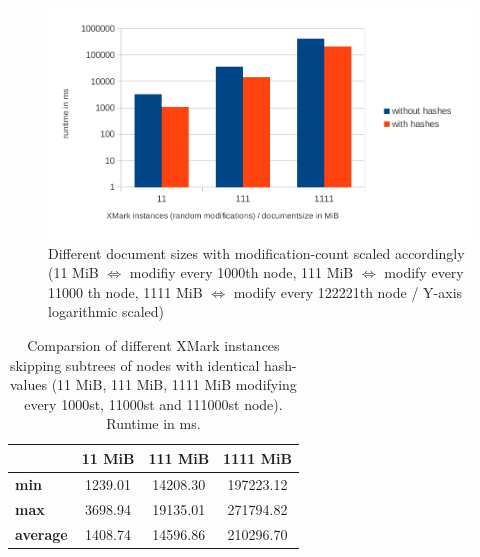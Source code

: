\begin{figure}[tb]
\centering
\includegraphics[width=\textwidth]{figures/diff-docsize-scale-pruned}
\caption{Different document sizes with modification-count scaled accordingly (11 MiB $\Leftrightarrow$ modifiy every 1000th node, 111 MiB $\Leftrightarrow$ modify every 11000 th node, 1111 MiB $\Leftrightarrow$ modify every 122221th node / Y-axis logarithmic scaled)} 
\label{fig:docScaling}
\end{figure}

\begin{table}[tb]
\centering 
\begin{tabular}[r]{|l|c|c|c|} 
\hline
& \textbf{11 MiB} & \textbf{111 MiB} & \textbf{1111 MiB}\\
\hline
\hline
\textbf{min} & 1239.01 & 14208.30 & 197223.12\\
\hline
\textbf{max} & 3698.94 & 19135.01 & 271794.82\\
\hline
\textbf{average} & 1408.74 & 14596.86 & 210296.70\\
\hline
\end{tabular}
\label{chap3:compPrunedDiffInstances}
\vspace{0.5em} 
\caption{Comparsion of different XMark instances skipping subtrees of nodes with identical hash-values (11 MiB, 111 MiB, 1111 MiB modifying every 1000st, 11000st and 111000st node). Runtime in ms.}
\end{table}


